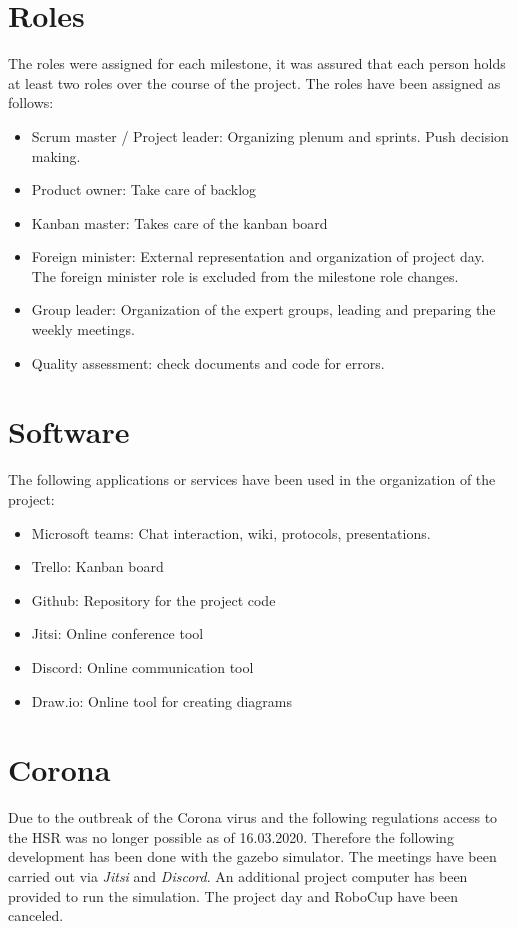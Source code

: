 \documentclass[main.tex]{subfiles}
\begin{document}
	\section{Roles}
	The roles were assigned for each milestone, it was assured that each person holds at least two roles over the course of the project. The roles have been assigned as follows:
	\begin{itemize}
		\item Scrum master / Project leader: Organizing plenum and sprints. Push decision making.
		\item Product owner: Take care of backlog
		\item Kanban master: Takes care of the kanban board
		\item Foreign minister: External representation and organization of project day. The foreign minister role is excluded from the milestone role changes.
		\item Group leader: Organization of the expert groups, leading and preparing the weekly meetings.
		\item Quality assessment: check documents and code for errors.
	\end{itemize}
	
	\section{Software}
	The following applications or services have been used in the organization of the project:
	\begin{itemize}
		\item Microsoft teams: Chat interaction, wiki, protocols, presentations.
		\item Trello: Kanban board
		\item Github: Repository for the project code
		\item Jitsi: Online conference tool
		\item Discord: Online communication tool
		\item Draw.io: Online tool for creating diagrams 
	\end{itemize}  

	\section{Corona}
	Due to the outbreak of the Corona virus and the following regulations access to the HSR was no longer possible as of 16.03.2020. Therefore the following development has been done with the gazebo simulator.
	The meetings have been carried out via \textit{Jitsi} and \textit{Discord}. An additional project computer has been provided to run the simulation.
	The project day and RoboCup have been canceled.
	
\end{document}
